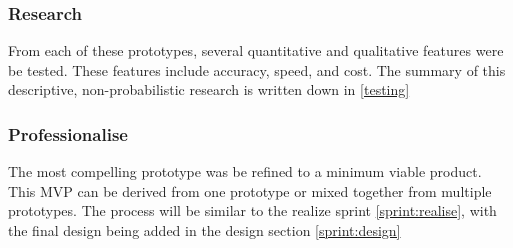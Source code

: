 \subsubsection{Research} \label{sprint:research}
From each of these prototypes, several quantitative and qualitative features were be tested. These features include accuracy, speed, and cost. The summary of this descriptive, non-probabilistic research is written down in \ref{testing}

\subsubsection{Professionalise} \label{sprint:professionalise}
The most compelling prototype was be refined to a minimum viable product. \cite{mvp} This \gls{MVP} can be derived from one prototype or mixed together from multiple prototypes. The process will be similar to the realize sprint \ref{sprint:realise}, with the final design being added in the design section \ref{sprint:design}
